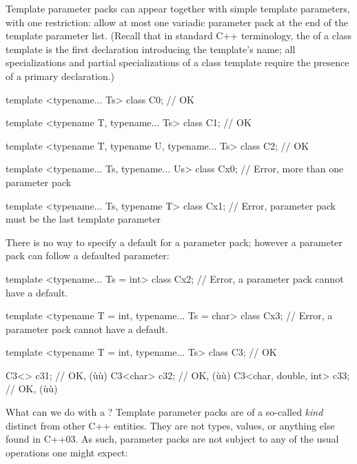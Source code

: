 \noindent Template parameter packs can appear together with simple template
parameters, with one restriction:  allow at most one variadic parameter pack at the end of
the template parameter list. (Recall that in standard C++ terminology,
the  of a class template is the first
declaration introducing the template's name; all specializations and
partial specializations of a class template require the presence of a
primary declaration.)

\begin{emcppslisting}
template <typename... Ts>
class C0;  // OK

template <typename T, typename... Ts>
class C1;  // OK

template <typename T, typename U, typename... Ts>
class C2;  // OK

template <typename... Ts, typename... Us>
class Cx0;  // Error, more than one parameter pack

template <typename... Ts, typename T>
class Cx1;  // Error, parameter pack must be the last template parameter
\end{emcppslisting}
    

\noindent There is no way to specify a default for a parameter pack; however a
parameter pack can follow a defaulted parameter:

\begin{emcppslisting}
template <typename... Ts = int>
class Cx2;  // Error, a parameter pack cannot have a default.

template <typename T = int, typename... Ts = char>
class Cx3;  // Error, a parameter pack cannot have a default.

template <typename T = int, typename... Ts>
class C3;  // OK

C3<> c31;                   // OK, (ù{}ù)
C3<char> c32;               // OK, (ù{}ù)
C3<char, double, int> c33;  // OK, (ù{}ù)
\end{emcppslisting}
    

\noindent What can we do with a ? Template
parameter packs are of a so-called \emph{kind} distinct from other C++
entities. They are not types, values, or anything else found in C++03.
As such, parameter packs are not subject to any of the usual operations
one might expect:

